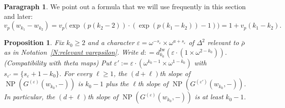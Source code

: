 \documentclass[12pt]{amsart}
\newtheorem{proposition}[subsection]{Proposition}
\theoremstyle{definition}
\newtheorem{para}[subsection]{Paragraph}
\numberwithin{equation}{subsection}
\DeclareMathOperator{\NP}{NP}
\newcommand{\Iw}{\mathrm{Iw}}
\begin{document}
\begin{para}
\label{P:para_133}
We point out a formula that we will use frequently in this section and later:
\begin{equation}
\label{E:vp of k1-k2}
v_p(w_{k_1} - w_{k_2}) = v_p\big(\exp(p(k_2-2)) \cdot (\exp(p(k_1-k_2))-1)\big) =  1+ v_p(k_1-k_2).
\end{equation}
\end{para}
\begin{proposition}
\label{P:ghost compatible with theta AL and p-stabilization_part1}
Fix $k_0 \geq 2$ and a character $\varepsilon= \omega^{-s_\varepsilon} \times \omega^{a+s_\varepsilon}$ of $\Delta^2$ relevant to $\bar \rho$ as in Notation~\ref{N:relevant varepsilon}. Write $d: = d_{k_0}^\Iw(\varepsilon\cdot (1\times \omega^{2-k_0}))$.
(Compatibility with theta maps)
Put $\varepsilon' := \varepsilon \cdot (\omega^{k_0-1} \times \omega^{1-k_0})$ with $s_{\varepsilon'} = \{s_\varepsilon +1-k_0\}$. For every $\ell\geq 1$, the $(d+\ell)$th slope of $\NP(G^{(\varepsilon)}(w_{k_0}, -))$ is $k_0-1$ plus the  $\ell$th slope of $\NP(G^{(\varepsilon')}(w_{k_0}, -))$.
In particular, the $(d+\ell)$th slope of $\NP(G^{(\varepsilon)}(w_{k_0}, -))$ is at least ${k_0}-1$.
\end{proposition}
\end{document}
